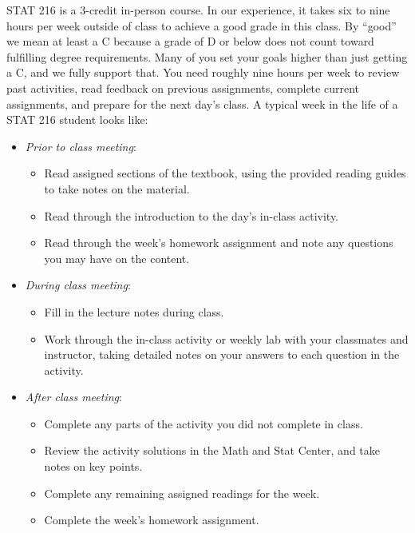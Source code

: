 \documentclass[
]{report}
\providecommand{\tightlist}{%
  \setlength{\itemsep}{0pt}\setlength{\parskip}{0pt}}
\begin{document}
STAT 216 is a 3-credit in-person course. In our experience, it takes six to nine hours per week outside of class to achieve a good grade in this class. By ``good'' we mean at least a C because a grade of D or below does not count toward fulfilling degree requirements. Many of you set your goals higher than just getting a C, and we fully support that. You need roughly nine hours per week to review past activities, read feedback on previous assignments, complete current assignments, and prepare for the next day's class. A typical week in the life of a STAT 216 student looks like:

\begin{itemize}
\tightlist
\item
  \emph{Prior to class meeting}:

  \begin{itemize}
  \tightlist
  \item
    Read assigned sections of the textbook, using the provided reading guides to take notes on the material.
  \item
    Read through the introduction to the day's in-class activity.
  \item
    Read through the week's homework assignment and note any questions you may have on the content.
  \end{itemize}
\item
  \emph{During class meeting}:

  \begin{itemize}
  \tightlist
  \item
    Fill in the lecture notes during class.
  \item
    Work through the in-class activity or weekly lab with your classmates and instructor, taking detailed notes on your answers to each question in the activity.
  \end{itemize}
\item
  \emph{After class meeting}:

  \begin{itemize}
  \tightlist
  \item
    Complete any parts of the activity you did not complete in class.
  \item
    Review the activity solutions in the Math and Stat Center, and take notes on key points.
  \item
    Complete any remaining assigned readings for the week.
  \item
    Complete the week's homework assignment.
  \end{itemize}
\end{itemize}
\end{document}
